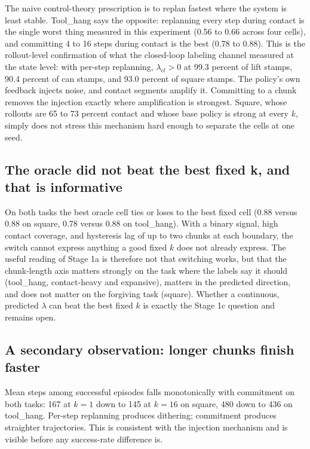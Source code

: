\documentclass[11pt]{article}
\begin{document}
The naive control-theory prescription is to replan fastest where the system is
least stable. Tool\_hang says the opposite: replanning every step during contact is
the single worst thing measured in this experiment (0.56 to 0.66 across four
cells), and committing 4 to 16 steps during contact is the best (0.78 to 0.88).
This is the rollout-level confirmation of what the closed-loop labeling channel
measured at the state level: with per-step replanning, $\lambda_{cl} > 0$ at 99.3
percent of lift stamps, 90.4 percent of can stamps, and 93.0 percent of square
stamps. The policy's own feedback injects noise, and contact segments amplify it.
Committing to a chunk removes the injection exactly where amplification is
strongest. Square, whose rollouts are 65 to 73 percent contact and whose base
policy is strong at every $k$, simply does not stress this mechanism hard enough to
separate the cells at one seed.

\subsection{The oracle did not beat the best fixed k, and that is informative}

On both tasks the best oracle cell ties or loses to the best fixed cell (0.88
versus 0.88 on square, 0.78 versus 0.88 on tool\_hang). With a binary signal, high
contact coverage, and hysteresis lag of up to two chunks at each boundary, the
switch cannot express anything a good fixed $k$ does not already express. The
useful reading of Stage 1a is therefore not that switching works, but that the
chunk-length axis matters strongly on the task where the labels say it should
(tool\_hang, contact-heavy and expansive), matters in the predicted direction, and
does not matter on the forgiving task (square). Whether a continuous, predicted
$\lambda$ can beat the best fixed $k$ is exactly the Stage 1c question and remains
open.

\subsection{A secondary observation: longer chunks finish faster}

Mean steps among successful episodes falls monotonically with commitment on both
tasks: 167 at $k{=}1$ down to 145 at $k{=}16$ on square, 480 down to 436 on
tool\_hang. Per-step replanning produces dithering; commitment produces straighter
trajectories. This is consistent with the injection mechanism and is visible before
any success-rate difference is.
\end{document}
